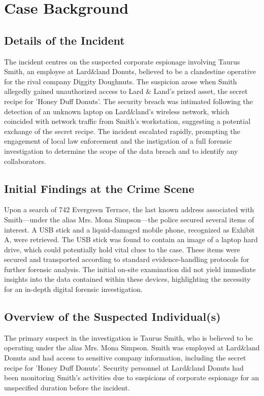 \chapter{Case Background}

\section{Details of the Incident}
The incident centres on the suspected corporate espionage involving Taurus Smith, an employee at Lard\&land Donuts, believed to be a clandestine operative for the rival company Diggity Doughnuts. The suspicion arose when Smith allegedly gained unauthorized access to Lard \& Land's prized asset, the secret recipe for 'Honey Duff Donuts'. The security breach was intimated following the detection of an unknown laptop on Lard\&land's wireless network, which coincided with network traffic from Smith's workstation, suggesting a potential exchange of the secret recipe. The incident escalated rapidly, prompting the engagement of local law enforcement and the instigation of a full forensic investigation to determine the scope of the data breach and to identify any collaborators.

\section{Initial Findings at the Crime Scene}
Upon a search of 742 Evergreen Terrace, the last known address associated with Smith—under the alias Mrs. Mona Simpson—the police secured several items of interest. A USB stick and a liquid-damaged mobile phone, recognized as Exhibit A, were retrieved. The USB stick was found to contain an image of a laptop hard drive, which could potentially hold vital clues to the case. These items were secured and transported according to standard evidence-handling protocols for further forensic analysis. The initial on-site examination did not yield immediate insights into the data contained within these devices, highlighting the necessity for an in-depth digital forensic investigation.

\section{Overview of the Suspected Individual(s)}
The primary suspect in the investigation is Taurus Smith, who is believed to be operating under the alias Mrs. Mona Simpson. Smith was employed at Lard\&land Donuts and had access to sensitive company information, including the secret recipe for 'Honey Duff Donuts'. Security personnel at Lard\&land Donuts had been monitoring Smith's activities due to suspicions of corporate espionage for an unspecified duration before the incident.

